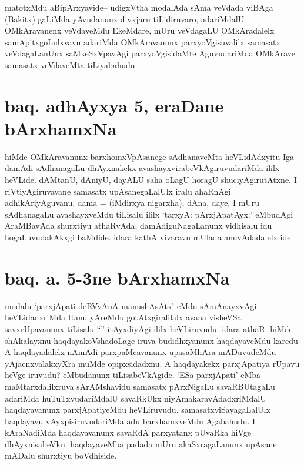 \begin{artha}
matotxMdu aBipArxyavide-- udigxVtha modalAda sAma veVdada viBAga (Bakitx) gaLiMda yAvudanunx divxjaru tiLidiruvaro, adariMdalU OMkAravanenx veVdaveMdu EkeMdare, mUru veVdagaLU OMkAradalelx samApitxgoLulxvavu adariMda OMkAravanunx parxyoVgisuvalilx samasatx veVdagaLanUnx saMkeSxVpavAgi parxyoVgisidaMte AguvudariMda OMkArave samasatx veVdaveMta tiLiyabahudu.
\end{artha}

\section*{baq. adhAyxya 5, eraDane bArxhamxNa}
\begin{artha}
hiMde OMkAravanunx barxhomxVpAsanege sAdhanaveMta heVLidAdxyitu Iga damAdi sAdhanagaLu dhAyxnakekx avashayxvirabeVkAgiruvudariMda ililx heVLide. dAMtanU, dAniyU, dayALU saha oLagU horagU shuciyAgirutAtxne. I riVtiyAgiruvavane samasatx upAsanegaLalUlx iralu ahaRnAgi adhikAriyAguvanu. dama = (iMdirxya nigarxha), dAna, daye, I mUru sAdhanagaLu avashayxveMdu tiLisalu ililx `tarxyA: pArxjApatAyx:' eMbudAgi AraMBavAda shurxtiyu athaRvAda; damAdiguNagaLanunx vidhisalu idu hogaLuvudakAkxgi baMdide. idara kathA vivaravu mUlada anuvAdadalelx ide.
\end{artha}

\section*{baq. a. 5-3ne bArxhamxNa}
\begin{artha}
modalu `parxjApati deRVvAnA manushAsAtx' eMdu sAmAnayxvAgi heVLidadxriMda Itanu yAreMdu gotAtxgiralilalx avana visheVSa savxrUpavanunx tiLisalu ``\stext'' itAyxdiyAgi ililx heVLiruvudu. idara athaR. hiMde shAkalayxnu haqdayakoVshadoLage iruva budidhxyanunx haqdayaveMdu karedu A haqdayadalelx nAmAdi parxpaMcavanunx upasaMhAra mADuvudeMdu yAjacnxvalakxyXra muMde opipxsidadxnu. A haqdayakekx parxjApatiya rUpavu heVge iruvudu? eMbudanunx tiLisabeVkAgide. `ESa parxjApati' eMba maMtarxdalilxruva sArAMshavidu samasatx pArxNigaLu savaRBUtagaLu adariMda huTuTxvudariMdalU savaRkUkx niyAmakaravAdadxriMdalU haqdayavanunx parxjApatiyeMdu heVLiruvudu. samasatxviSayagaLalUlx haqdayavu vAyxpisiruvudariMda adu barxhamxveMdu Agabahudu. I kAraNadiMda haqdayavanunx savaRdA parxyatanx pUvaRka hiVge dhAyxnisabeVku. haqdayaveMba padada mUru akaSxragaLanunx upAsane mADalu shurxtiyu boVdhiside.
\end{artha}

